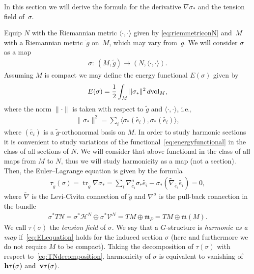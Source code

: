 \documentclass[pdftex]{sigma}
\numberwithin{equation}{section}
\newcommand{\skal}[2]{\langle #1,#2\rangle}
\begin{document}
In this section we will derive the formula for the derivative $\nabla\sigma_{\ast}$ and the tension f\/ield of~$\sigma$.

Equip $N$ with the Riemannian metric $\skal{\cdot}{\cdot}$ given by \eqref{eq:riemmetriconN} and~$M$ with a Riemannian metric~$\tilde{g}$ on~$M$, which may vary from~$g$. We will consider $\sigma$ as a map
\begin{gather*}
\sigma\colon \ (M,\tilde g)\to (N,\skal{\cdot}{\cdot}).
\end{gather*}
Assuming $M$ is compact we may def\/ine the energy functional $E(\sigma)$ given by
\begin{gather}\label{eq:energyfunctional}
E(\sigma)=\frac{1}{2}\int_M \|\sigma_{\ast}\|^2\,d{\rm vol}_M,
\end{gather}
where the norm $\|\cdot\|$ is taken with respect to $\tilde g$ and $\skal{\cdot}{\cdot}$, i.e.,
\begin{gather*}
\|\sigma_{\ast}\|^2=\sum_i\skal{\sigma_{\ast}(\tilde{e_i})}{\sigma_{\ast}(\tilde{e_i})},
\end{gather*}
where $(\tilde{e_i})$ is a $\tilde{g}$-orthonormal basis on $M$. In order to study harmonic sections it is convenient to study variations of the functional~\eqref{eq:energyfunctional} in the class of all sections of $N$. We will consider that above functional in the class of all maps from $M$ to $N$, thus we will study harmonicity as a map (not a section). Then, the Euler--Lagrange equation is given by the formula
\begin{gather}\label{eq:ELequation}
\tau_{\tilde{g}}(\sigma)=\operatorname{tr}_{\tilde g}\nabla\sigma_{\ast}
=\sum_i\nabla^{\sigma}_{\tilde{e_i}}\sigma_{\ast}\tilde{e_i}
-\sigma_{\ast}(\tilde{\nabla}_{\tilde{e_i}}\tilde{e_i})=0,
\end{gather}
where $\tilde{\nabla}$ is the Levi-Civita connection of $\tilde{g}$ and $\nabla^{\sigma}$ is the pull-back connection in the bundle
\begin{gather}\label{eq:TNdecomposition}
\sigma^{\ast}TN= \sigma^{\ast}\mathcal{H}^N\oplus\sigma^{\ast}\mathcal{V}^N =TM\oplus\mathfrak{m}_P=TM\oplus\mathfrak{m}(M).
\end{gather}
We call $\tau(\sigma)$ the {\it tension field} of $\sigma$. We say that a $G$-structure is {\it harmonic as a map} if~\eqref{eq:ELequation} holds for the induced section $\sigma$ (here and furthermore we do not require $M$ to be compact). Taking the decomposition of $\tau(\sigma)$ with respect to~\eqref{eq:TNdecomposition}, harmonicity of $\sigma$ is equivalent to vanishing of~${\bf h}\tau(\sigma)$ and~${\bf v}\tau(\sigma)$.
\end{document}
